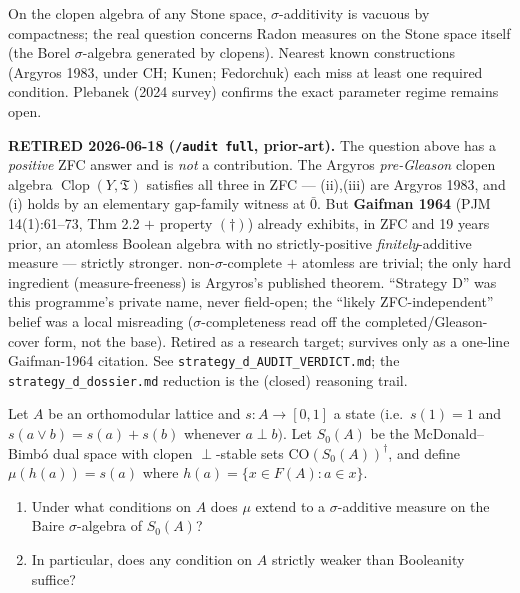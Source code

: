 On the clopen algebra of any Stone space, $\sigma$-additivity is
vacuous by compactness; the real question concerns Radon measures on
the Stone space itself (the Borel $\sigma$-algebra generated by
clopens).  Nearest known constructions (Argyros 1983, under CH;
Kunen; Fedorchuk) each miss at least one required condition.
Plebanek (2024 survey) confirms the exact parameter regime remains
open.

\smallskip
\noindent\textbf{RETIRED 2026-06-18 (\texttt{/audit full}, prior-art).} The
question above has a \emph{positive} ZFC answer and is \emph{not} a contribution.
The Argyros \emph{pre-Gleason} clopen algebra $\operatorname{Clop}(Y,\mathfrak{T})$
satisfies all three in ZFC --- (ii),(iii) are Argyros 1983, and (i) holds by an
elementary gap-family witness at $\bar 0$. But \textbf{Gaifman 1964} (PJM
14(1):61--73, Thm 2.2 $+$ property $(\dagger)$) already exhibits, in ZFC and 19
years prior, an atomless Boolean algebra with no strictly-positive
\emph{finitely}-additive measure --- strictly stronger. non-$\sigma$-complete $+$
atomless are trivial; the only hard ingredient (measure-freeness) is Argyros's
published theorem. ``Strategy D'' was this programme's private name, never
field-open; the ``likely ZFC-independent'' belief was a local misreading
($\sigma$-completeness read off the completed/Gleason-cover form, not the base).
Retired as a research target; survives only as a one-line Gaifman-1964 citation.
See \texttt{strategy\_d\_AUDIT\_VERDICT.md}; the \texttt{strategy\_d\_dossier.md}
reduction is the (closed) reasoning trail.


\begin{openproblem}
\label{op:oml-extension}
Let $A$ be an orthomodular lattice and $s\colon A\to[0,1]$ a state
$($i.e.\ $s(1)=1$ and $s(a\vee b)=s(a)+s(b)$ whenever $a\perp b)$.
Let $S_0(A)$ be the McDonald--Bimb\'{o} dual space with clopen
$\perp$-stable sets $\mathrm{CO}(S_0(A))^{\dagger}$, and define
$\mu(h(a))=s(a)$ where $h(a)=\{x\in F(A):a\in x\}$.
\begin{enumerate}[label=(\alph*)]
  \item Under what conditions on $A$ does $\mu$ extend to a
    $\sigma$-additive measure on the Baire $\sigma$-algebra of
    $S_0(A)$?
  \item In particular, does any condition on $A$ strictly weaker
    than Booleanity suffice?
\end{enumerate}
\end{openproblem}

